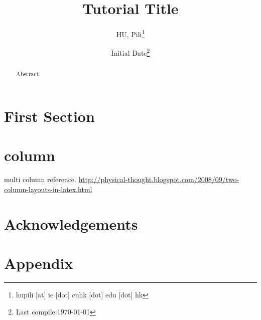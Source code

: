 



\author{HU, Pili\thanks{hupili [at] ie [dot] cuhk [dot] edu [dot] hk}}

\title{Tutorial Title}
\date{Initial Date\thanks{Last compile:\today}}



\maketitle
\begin{abstract}
	Abstract. 
\end{abstract}

\pagebreak
\setcounter{tocdepth}{2}
\tableofcontents
\pagebreak



\section{First Section}


\section{column}
multi column reference. 
\url{http://physical-thought.blogspot.com/2008/09/two-column-layouts-in-latex.html}





\section*{Acknowledgements}




\section*{Appendix}



